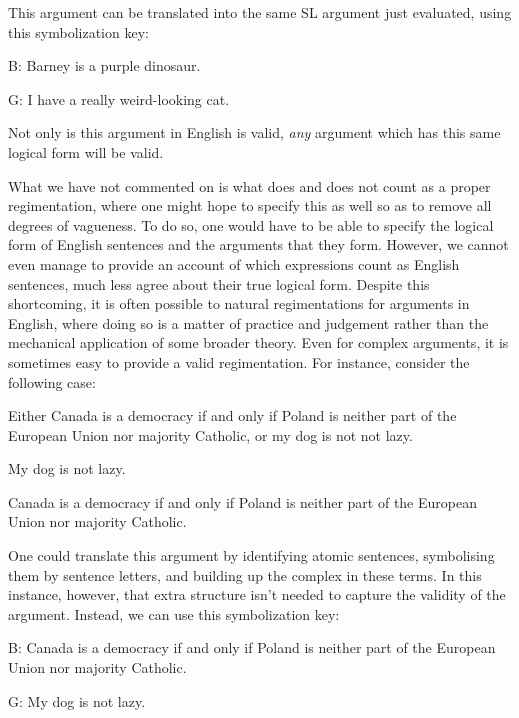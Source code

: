 This argument can be translated into the same SL argument just evaluated, using this symbolization key:

\begin{ekey}
\item[B:] Barney is a purple dinosaur.
\item[G:] I have a really weird-looking cat.
\end{ekey}

Not only is this argument in English is valid, \textit{any} argument which has this same logical form will be valid.


What we have not commented on is what does and does not count as a proper regimentation, where one might hope to specify this as well so as to remove all degrees of vagueness.
To do so, one would have to be able to specify the logical form of English sentences and the arguments that they form.
However, we cannot even manage to provide an account of which expressions count as English sentences, much less agree about their true logical form.
Despite this shortcoming, it is often possible to natural regimentations for arguments in English, where doing so is a matter of practice and judgement rather than the mechanical application of some broader theory.
Even for complex arguments, it is sometimes easy to provide a valid regimentation.
For instance, consider the following case:

\begin{earg}
\item Either Canada is a democracy if and only if Poland is neither part of the European Union nor majority Catholic, or my dog is not not lazy.
\item My dog is not lazy.
\item[\therefore] Canada is a democracy if and only if Poland is neither part of the European Union nor majority Catholic.
\end{earg}

One could translate this argument by identifying atomic sentences, symbolising them by sentence letters, and building up the complex in these terms.
In this instance, however, that extra structure isn't needed to capture the validity of the argument.
Instead, we can use this symbolization key:

\begin{ekey}
\item[B:] Canada is a democracy if and only if Poland is neither part of the European Union nor majority Catholic.
\item[G:] My dog is not lazy.
\end{ekey}

